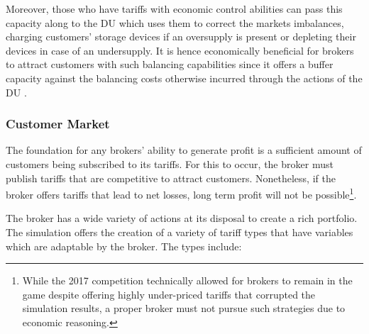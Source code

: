 Moreover, those who have tariffs with economic control abilities can pass this capacity along to the \ac{DU} which uses
them to correct the markets imbalances, charging customers' storage devices if an oversupply is present or
depleting their devices in case of an undersupply. It is hence economically beneficial for brokers to attract
customers with such balancing capabilities since it offers a buffer capacity against the balancing costs otherwise
incurred through the actions of the \ac{DU} \citep[p.5]{ketter2018powertac}.

\subsubsection{Customer Market}

The foundation for any brokers' ability to generate profit is a sufficient amount of customers being subscribed to its tariffs. For
this to occur, the broker must publish tariffs that are competitive to attract customers. Nonetheless, if the
broker offers tariffs that lead to net losses, long term profit will not be possible\footnote{While the 2017
    competition technically allowed for brokers to remain in the game despite offering highly under-priced tariffs that
    corrupted the simulation results, a proper broker must not pursue such strategies due to economic
reasoning.}.

The broker has a wide variety of actions at its disposal to create a rich portfolio. The simulation offers the
creation of a variety of tariff types that have variables which are adaptable by the broker. The types include:

